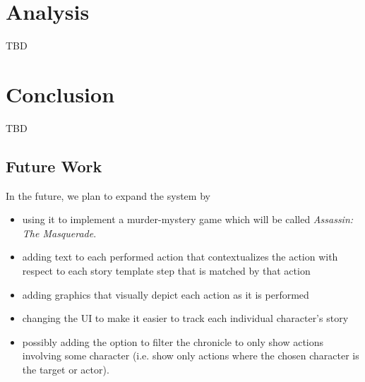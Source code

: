 \documentclass[letterpaper]{article}
\begin{document}
\section{Analysis}
TBD

\section{Conclusion}
TBD

\subsection{Future Work}
In the future, we plan to expand the system by
\begin{itemize}
    \item using it to implement a murder-mystery game which will be called
        \textit{Assassin: The Masquerade}.
    \item adding text to each performed action that contextualizes the action with respect to each
        story template step that is matched by that action
    \item adding graphics that visually depict each action as it is performed
    \item changing the UI to make it easier to track each individual character's story
    \item possibly adding the option to filter the chronicle to only show actions
        involving some character (i.e. show only actions where the chosen character is the
        target or actor).
\end{itemize}


\end{document}
